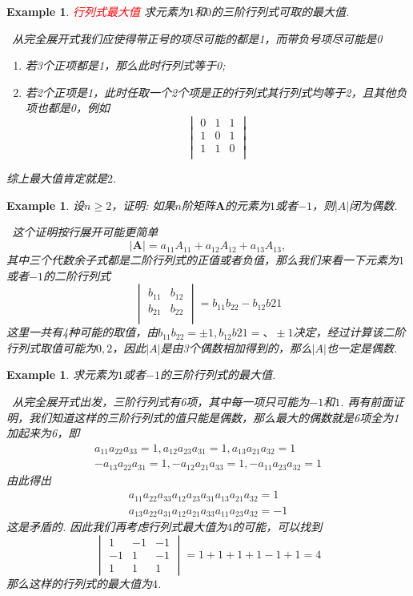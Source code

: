 \documentclass{article}
\newtheorem{example}[theorem]{Example}
\newcommand{\hints}{{\color{blue} \text{hints}}}
\newcommand{\mbf}[1]{\bm{#1}}
\newcommand{\redt}[1]{\textcolor{red}{#1}}
\begin{document}
\begin{example}
\rm \redt{行列式最大值} 求元素为$1$和$0$的三阶行列式可取的最大值.

\hints\ 从完全展开式我们应使得带正号的项尽可能的都是1，而带负号项尽可能是0
\begin{enumerate}
	\item 若3个正项都是1，那么此时行列式等于0;
	\item 若2个正项是1，此时任取一个2个项是正的行列式其行列式均等于2，且其他负项也都是0，例如
	$$
	\begin{vmatrix}
	0 & 1 & 1\\
	1 & 0 & 1\\
	1 & 1 & 0\\
	\end{vmatrix}
	$$
\end{enumerate}
综上最大值肯定就是$2$. 
\end{example}

\begin{example}
\rm 设$n \geq 2$，证明: 如果$n$阶矩阵$\mbf{A}$的元素为$1$或者$-1$，则$|A|$闭为偶数. 

\hints\ 这个证明按行展开可能更简单
$$
|\mbf{A}| = a_{11}A_{11} + a_{12}A_{12} +a_{13}A_{13},
$$
其中三个代数余子式都是二阶行列式的正值或者负值，那么我们来看一下元素为$1$或者$-1$的二阶行列式
$$
\begin{vmatrix}
b_{11} & b_{12} \\
b_{21} & b_{22} \\
\end{vmatrix}  = b_{11}b_{22} - b_{12}b{21}
$$
这里一共有4种可能的取值，由$b_{11}b_{22} = \pm 1, b_{12}b{21} = 、\pm 1$决定，经过计算该二阶行列式取值可能为$0,2$，因此$|A|$是由3个偶数相加得到的，那么$|A|$也一定是偶数. 
\end{example}

\begin{example}
\rm 求元素为$1$或者$-1$的三阶行列式的最大值. 

\hints\ 从完全展开式出发，三阶行列式有6项，其中每一项只可能为$-1$和$1$. 再有前面证明，我们知道这样的三阶行列式的值只能是偶数，那么最大的偶数就是6项全为1加起来为6，即
$$
\begin{array}{ll}
a_{11}a_{22}a_{33} = 1, a_{12}a_{23}a_{31} = 1, a_{13}a_{21}a_{32} = 1 \\
-a_{13}a_{22}a_{31} = 1, -a_{12}a_{21}a_{33} = 1, -a_{11}a_{23}a_{32} = 1 
\end{array}
$$
由此得出
$$
\begin{array}{ll}
a_{11}a_{22}a_{33}a_{12}a_{23}a_{31}a_{13}a_{21}a_{32} = 1 \\
a_{13}a_{22}a_{31}a_{12}a_{21}a_{33}a_{11}a_{23}a_{32} = -1 
\end{array}
$$
这是矛盾的. 因此我们再考虑行列式最大值为$4$的可能，可以找到
$$
\begin{vmatrix}
1 & -1 & -1\\
-1 & 1 & -1 \\
1 & 1 & 1 
\end{vmatrix} = 1 + 1 + 1 + 1 - 1 + 1 = 4
$$
那么这样的行列式的最大值为$4$. 
\end{example}
\end{document}

